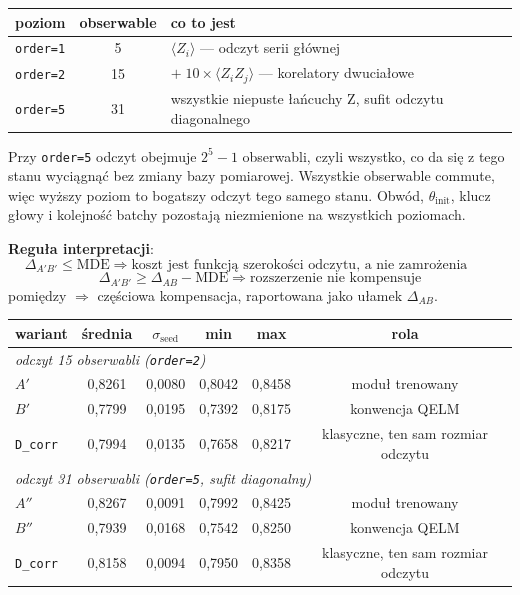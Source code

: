 \documentclass[11pt, a4paper]{article}
\begin{document}
\begin{table}[H]
\centering
\renewcommand{\arraystretch}{1.3}
\begin{tabular}{lcl}
\toprule
\textbf{poziom} & \textbf{obserwable} & \textbf{co to jest} \\
\midrule
\texttt{order=1} & 5 & $\langle Z_i \rangle$ --- odczyt serii głównej \\
\texttt{order=2} & 15 & $+\;10 \times \langle Z_i Z_j \rangle$ --- korelatory dwuciałowe \\
\texttt{order=5} & 31 & wszystkie niepuste łańcuchy Z, sufit odczytu diagonalnego \\
\bottomrule
\end{tabular}
\begin{minipage}{\textwidth}
\footnotesize Przy \texttt{order=5} odczyt obejmuje $2^5-1$ obserwabli, czyli wszystko, co da się z tego stanu wyciągnąć bez zmiany bazy pomiarowej. Wszystkie obserwable commute, więc wyższy poziom to bogatszy odczyt tego samego stanu. Obwód, $\theta_{\text{init}}$, klucz głowy i kolejność batchy pozostają niezmienione na wszystkich poziomach.
\end{minipage}
\end{table}

\textbf{Reguła interpretacji}:
\[
\Delta_{A'B'} \le \text{MDE} \Rightarrow \text{koszt jest funkcją szerokości odczytu, a nie zamrożenia} \qquad
\]
\[
\Delta_{A'B'} \ge \Delta_{AB} - \text{MDE} \Rightarrow \text{rozszerzenie nie kompensuje}
\]
pomiędzy $\Rightarrow$ częściowa kompensacja, raportowana jako ułamek $\Delta_{AB}$.

\begin{table}[H]
\centering
\renewcommand{\arraystretch}{1.3}
\begin{tabular}{lccccc}
\toprule
\textbf{wariant} & \textbf{średnia} & $\sigma_{\text{seed}}$ & \textbf{min} & \textbf{max} & \textbf{rola} \\
\midrule
\multicolumn{6}{l}{\emph{odczyt 15 obserwabli (\texttt{order=2})}} \\
$A'$ & 0,8261 & 0,0080 & 0,8042 & 0,8458 & moduł trenowany \\
$B'$ & 0,7799 & 0,0195 & 0,7392 & 0,8175 & konwencja QELM \\
\texttt{D\_corr} & 0,7994 & 0,0135 & 0,7658 & 0,8217 & klasyczne, ten sam rozmiar odczytu \\
\midrule
\multicolumn{6}{l}{\emph{odczyt 31 obserwabli (\texttt{order=5}, sufit diagonalny)}} \\
$A''$ & 0,8267 & 0,0091 & 0,7992 & 0,8425 & moduł trenowany \\
$B''$ & 0,7939 & 0,0168 & 0,7542 & 0,8250 & konwencja QELM \\
\texttt{D\_corr} & 0,8158 & 0,0094 & 0,7950 & 0,8358 & klasyczne, ten sam rozmiar odczytu \\
\bottomrule
\end{tabular}
\end{table}
\end{document}
